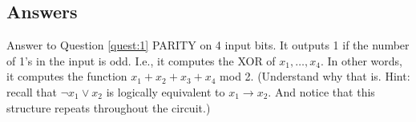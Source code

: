 \subsection{Answers}








\begin{trailer}{Answer to Question \ref{quest:1}}\label{trailer:xor-circuit}
     PARITY on 4 input bits. It outputs 1 if the number of 1's in the input is odd. I.e., it computes the XOR of $x_1, \ldots, x_4$. In other words, it computes the function $x_1+x_2+x_3+x_4$ mod 2. (Understand why that is. Hint: recall that ${\neg x_1}\lor x_2$ is logically equivalent to $x_1\to x_2$. And notice that this structure repeats throughout the circuit.)
\end{trailer}



